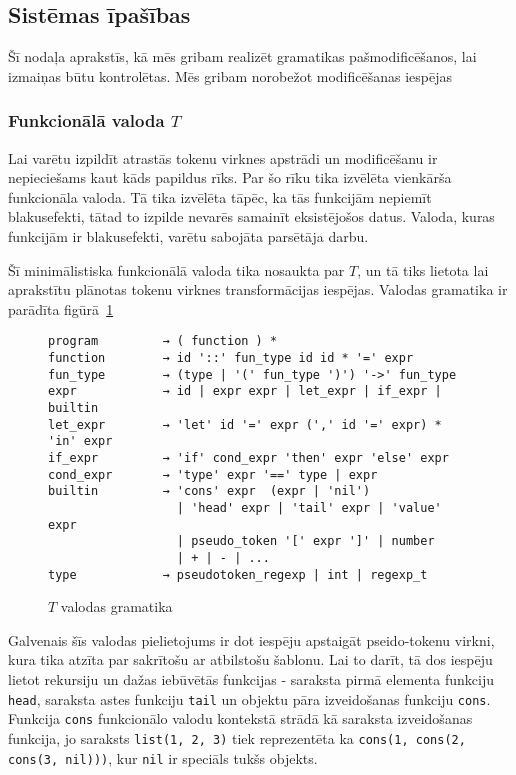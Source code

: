 
\subsection{\label{subsec:system_qualities}Sistēmas īpašības}
Šī nodaļa aprakstīs, kā mēs gribam realizēt gramatikas pašmodificēšanos, lai izmaiņas būtu kontrolētas.
Mēs gribam norobežot modificēšanas iespējas

\subsubsection{Funkcionālā valoda $T$}
Lai varētu izpildīt atrastās tokenu virknes apstrādi un modificēšanu ir nepieciešams kaut kāds papildus rīks. Par šo rīku tika izvēlēta vienkārša funkcionāla valoda. Tā tika izvēlēta tāpēc, ka tās funkcijām nepiemīt blakusefekti, tātad to izpilde nevarēs samainīt eksistējošos datus. Valoda, kuras funkcijām ir blakusefekti, varētu sabojāta parsētāja darbu.

Šī minimālistiska funkcionālā valoda tika nosaukta par $T$, un tā tiks lietota lai aprakstītu plānotas tokenu virknes transformācijas iespējas. Valodas gramatika ir parādīta figūrā~\ref{fig:tlanguagegrammar}

\begin{figure}
\begin{verbatim}
program         → ( function ) *
function        → id '::' fun_type id id * '=' expr
fun_type        → (type | '(' fun_type ')') '->' fun_type
expr            → id | expr expr | let_expr | if_expr | builtin
let_expr        → 'let' id '=' expr (',' id '=' expr) * 'in' expr
if_expr         → 'if' cond_expr 'then' expr 'else' expr
cond_expr       → 'type' expr '==' type | expr
builtin         → 'cons' expr  (expr | 'nil') 
                  | 'head' expr | 'tail' expr | 'value' expr
                  | pseudo_token '[' expr ']' | number
                  | + | - | ...
type            → pseudotoken_regexp | int | regexp_t
\end{verbatim}
\caption{\label{fig:tlanguagegrammar}$T$ valodas gramatika}
\end{figure}


Galvenais šīs valodas pielietojums ir dot iespēju apstaigāt pseido-tokenu virkni, kura tika atzīta par sakrītošu ar atbilstošu šablonu. Lai to darīt, tā dos iespēju lietot rekursiju un dažas iebūvētās funkcijas - saraksta pirmā elementa funkciju \verb|head|, saraksta astes funkciju \verb|tail| un objektu pāra izveidošanas funkciju \verb|cons|. Funkcija \verb|cons| funkcionālo valodu kontekstā strādā kā saraksta izveidošanas funkcija, jo saraksts \verb|list(1, 2, 3)| tiek reprezentēta ka \verb|cons(1, cons(2, cons(3, nil)))|, kur \verb|nil| ir speciāls tukšs objekts.

